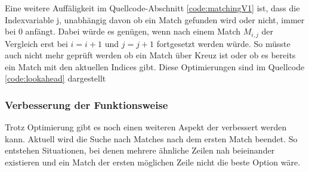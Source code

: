 Eine weitere Auffäligkeit im Quellcode-Abschnitt \ref{code:matchingV1} ist, dass die Indexvariable j, unabhängig davon ob ein Match gefunden wird oder nicht, immer bei 0 anfängt. Dabei würde es genügen, wenn nach einem Match $M_{i,j}$ der Vergleich erst bei $i = i + 1$ und $j = j + 1$ fortgesetzt werden würde. So müsste auch nicht mehr geprüft werden ob ein Match über Kreuz ist oder ob es bereits ein Match mit den aktuellen Indices gibt. Diese Optimierungen sind im Quellcode \ref{code:lookahead} dargestellt



\subsubsection{Verbesserung der Funktionsweise}\label{bestMatch}

Trotz Optimierung gibt es noch einen weiteren Aspekt der verbessert werden kann. Aktuell wird die Suche nach Matches nach dem ersten Match beendet. So entstehen Situationen, bei denen mehrere ähnliche Zeilen nah beieinander existieren und ein Match der ersten möglichen Zeile nicht die beste Option wäre.

